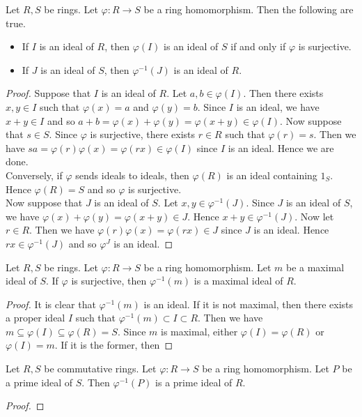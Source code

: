 \documentclass[a4paper]{article}
\begin{document}
\begin{lmm}{}{} Let $R,S$ be rings. Let $\varphi:R\to S$ be a ring homomorphism. Then the following are true. 
\begin{itemize}
\item If $I$ is an ideal of $R$, then $\varphi(I)$ is an ideal of $S$ if and only if $\varphi$ is surjective. 
\item If $J$ is an ideal of $S$, then $\varphi^{-1}(J)$ is an ideal of $R$. 
\end{itemize} 
\begin{proof}
Suppose that $I$ is an ideal of $R$. Let $a,b\in\varphi(I)$. Then there exists $x,y\in I$ such that $\varphi(x)=a$ and $\varphi(y)=b$. Since $I$ is an ideal, we have $x+y\in I$ and so $a+b=\varphi(x)+\varphi(y)=\varphi(x+y)\in\varphi(I)$. Now suppose that $s\in S$. Since $\varphi$ is surjective, there exists $r\in R$ such that $\varphi(r)=s$. Then we have $sa=\varphi(r)\varphi(x)=\varphi(rx)\in\varphi(I)$ since $I$ is an ideal. Hence we are done. \\

Conversely, if $\varphi$ sends ideals to ideals, then $\varphi(R)$ is an ideal containing $1_S$. Hence $\varphi(R)=S$ and so $\varphi$ is surjective. \\

Now suppose that $J$ is an ideal of $S$. Let $x,y\in\varphi^{-1}(J)$. Since $J$ is an ideal of $S$, we have $\varphi(x)+\varphi(y)=\varphi(x+y)\in J$. Hence $x+y\in\varphi^{-1}(J)$. Now let $r\in R$. Then we have $\varphi(r)\varphi(x)=\varphi(rx)\in J$ since $J$ is an ideal. Hence $rx\in\varphi^{-1}(J)$ and so $\varphi^{J}$ is an ideal. 
\end{proof}
\end{lmm}

\begin{lmm}{}{} Let $R,S$ be rings. Let $\varphi:R\to S$ be a ring homomorphism. Let $m$ be a maximal ideal of $S$. If $\varphi$ is surjective, then $\varphi^{-1}(m)$ is a maximal ideal of $R$. 
\begin{proof}
It is clear that $\varphi^{-1}(m)$ is an ideal. If it is not maximal, then there exists a proper ideal $I$ such that $\varphi^{-1}(m)\subset I\subset R$. Then we have $m\subseteq\varphi(I)\subseteq\varphi(R)=S$. Since $m$ is maximal, either $\varphi(I)=\varphi(R)$ or $\varphi(I)=m$. If it is the former, then 
\end{proof}
\end{lmm}

\begin{lmm}{}{} Let $R,S$ be commutative rings. Let $\varphi:R\to S$ be a ring homomorphism. Let $P$ be a prime ideal of $S$. Then $\varphi^{-1}(P)$ is a prime ideal of $R$. 
\begin{proof}

\end{proof}
\end{lmm}
\end{document}
